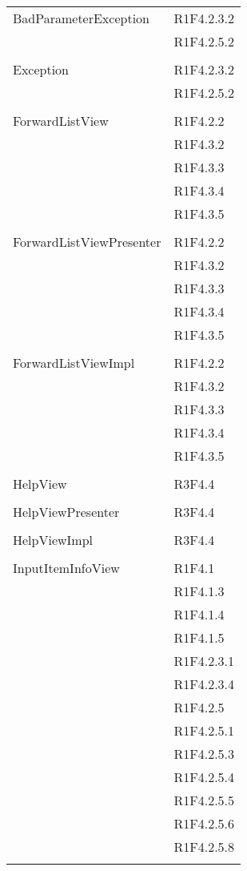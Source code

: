 \begin{center}
\begin{longtable}{|p{7cm}|p{7cm}|}
		BadParameterException & R1F4.2.3.2 \\ & R1F4.2.5.2 \\ & \\ \hline
		Exception & R1F4.2.3.2 \\ & R1F4.2.5.2 \\ & \\ \hline
		ForwardListView & R1F4.2.2 \\ & R1F4.3.2 \\ & R1F4.3.3 \\ & R1F4.3.4 \\ & R1F4.3.5 \\ & \\ \hline
		ForwardListViewPresenter & R1F4.2.2 \\ & R1F4.3.2 \\ & R1F4.3.3 \\ & R1F4.3.4 \\ & R1F4.3.5 \\ & \\ \hline
		ForwardListViewImpl & R1F4.2.2 \\ & R1F4.3.2 \\ & R1F4.3.3 \\ & R1F4.3.4 \\ & R1F4.3.5 \\ & \\ \hline
		HelpView & R3F4.4 \\ & \\ \hline
		HelpViewPresenter & R3F4.4 \\ & \\ \hline
		HelpViewImpl & R3F4.4 \\ & \\ \hline
		InputItemInfoView & R1F4.1 \\ & R1F4.1.3 \\ & R1F4.1.4 \\ & R1F4.1.5 \\ & R1F4.2.3.1 \\ & R1F4.2.3.4 \\ & R1F4.2.5 \\ & R1F4.2.5.1 \\ & R1F4.2.5.3 \\ & R1F4.2.5.4 \\ & R1F4.2.5.5 \\ & R1F4.2.5.6 \\ & R1F4.2.5.8 \\ & \\ \hline

\end{longtable}
\end{center}
